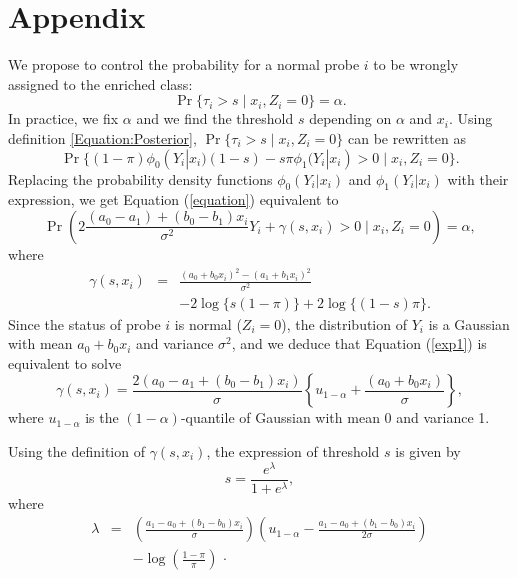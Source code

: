 \documentclass{bioinfo}
\begin{document}
\section{Appendix}\label{append}
We propose to control the probability for a normal probe $i$ to be
wrongly assigned to the enriched class:
\begin{equation}\label{equation}
\Pr\{\tau_{i} > s \;|\; x_i, Z_i =0\}=\alpha.
\end{equation}
In practice, we fix $\alpha$ and we find the threshold $s$ depending
on $\alpha$ and $x_i$. Using definition \ref{Equation:Posterior},
$\Pr\{\tau_{i} > s \;|\; x_i, Z_i =0\}$ can be rewritten as
\begin{equation*}
\Pr\{ (1-\pi) \phi_0(Y_i|x_i) (1-s) - s \pi \phi_1(Y_i|x_i) > 0
\;|\; x_i, Z_i =0\}.
\end{equation*}
Replacing the probability density functions $\phi_0(Y_i|x_i)$ and
$\phi_1(Y_i|x_i)$ with their expression, we get Equation
(\ref{equation}) equivalent to
\begin{equation}\label{exp1}
\Pr\left(2\frac{(a_0-a_1)+(b_0-b_1)x_i}{\sigma^{2}}Y_{i} +
\gamma(s,x_i) > 0 \;|\; x_i,Z_i=0\right)=\alpha,
\end{equation}
where
\begin{eqnarray*}
\gamma(s,x_i) &=& \frac{(a_0+b_0x_i)^{2}-(a_1+b_1x_i)^{2}}{\sigma^2} \\
&&-2\log
\{s(1-\pi)\} + 2\log \{(1-s)\pi\}.
\end{eqnarray*}
Since the status of probe $i$ is normal ($Z_i=0$), the distribution
of $Y_i$ is a Gaussian with mean $a_0+b_0x_i$ and variance
$\sigma^2$, and we deduce that Equation (\ref{exp1}) is equivalent
to solve
$$\gamma(s, x_i) = \frac{2(a_0-a_1+(b_0-b_1)x_i)}{\sigma} \left\{u_{1-\alpha} + \frac{(a_0+b_0x_i)}{\sigma}\right\},$$  where
$u_{1-\alpha}$ is the  $(1-\alpha)$-quantile  of Gaussian with mean
0 and variance 1.

Using the definition of $\gamma(s, x_i)$, the expression of
threshold $s$ is given by
$$ s = \frac{e^{\lambda}}{1+e^{\lambda}},$$
where
\begin{eqnarray*}
\lambda &=& \left(\frac{a_1-a_0+(b_1-b_0)x_i}{\sigma}\right)
\left(u_{1-\alpha} - \frac{a_1-a_0+(b_1-b_0)x_i}{2\sigma}\right)\\
&&- \log\left(\frac{1-\pi}{\pi}\right)\,\cdot
\end{eqnarray*}
\end{document}
